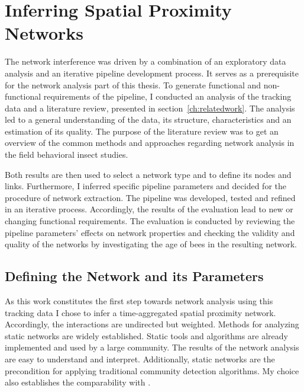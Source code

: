 \section{Inferring Spatial Proximity Networks}
The network interference was driven by a combination of an exploratory data analysis and an iterative pipeline development process.
It serves as a prerequisite for the network analysis part of this thesis.
To generate functional and non-functional requirements of the pipeline, I conducted an analysis of the tracking data and a literature review, presented in section~\ref{ch:relatedwork}.
The analysis led to a general understanding of the data, its structure, characteristics and an estimation of its quality.
The purpose of the literature review was to get an overview of the common methods and approaches regarding network analysis in the field behavioral insect studies.

Both results are then used to select a network type and to define its nodes and links.
Furthermore, I inferred specific pipeline parameters and decided for the procedure of network extraction.
The pipeline was developed, tested and refined in an iterative process.
Accordingly, the results of the evaluation lead to new or changing functional requirements.
The evaluation is conducted by reviewing the pipeline parameters' effects on network properties and checking the validity and quality of the networks by investigating the age of bees in the resulting network.

\subsection{Defining the Network and its Parameters}
As this work constitutes the first step towards network analysis using this tracking data I chose to infer a time-aggregated spatial proximity network.
Accordingly, the interactions are undirected but weighted.
Methods for analyzing static networks are widely established.
Static tools and algorithms are already implemented and used by a large community.
The results of the network analysis are easy to understand and interpret.
Additionally, static networks are the precondition for applying traditional community detection algorithms. My choice also establishes the comparability with \textcite{mersch2013tracking}.

